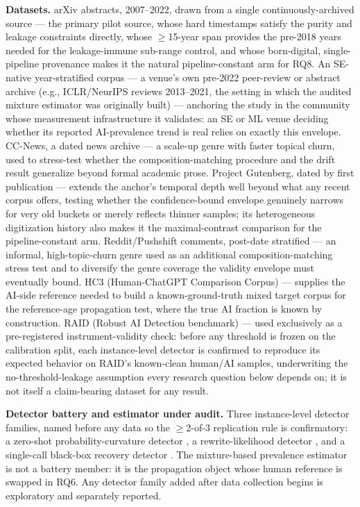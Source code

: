 \documentclass[conference]{IEEEtran}
\begin{document}
\textbf{Datasets.}  arXiv abstracts, 2007--2022, drawn from a single continuously-archived source --- the primary pilot source, whose hard timestamps satisfy the purity and leakage constraints directly, whose $\geq$15-year span provides the pre-2018 years needed for the leakage-immune sub-range control, and whose born-digital, single-pipeline provenance makes it the natural pipeline-constant arm for RQ8. An SE-native year-stratified corpus --- a venue's own pre-2022 peer-review or abstract archive (e.g., ICLR/NeurIPS reviews 2013--2021, the setting in which the audited mixture estimator \cite{MonitorAIScale} was originally built) --- anchoring the study in the community whose measurement infrastructure it validates: an SE or ML venue deciding whether its reported AI-prevalence trend is real relies on exactly this envelope. CC-News, a dated news archive --- a scale-up genre with faster topical churn, used to stress-test whether the composition-matching procedure and the drift result generalize beyond formal academic prose. Project Gutenberg, dated by first publication --- extends the anchor's temporal depth well beyond what any recent corpus offers, testing whether the confidence-bound envelope genuinely narrows for very old buckets or merely reflects thinner samples; its heterogeneous digitization history also makes it the maximal-contrast comparison for the pipeline-constant arm. Reddit/Pushshift comments, post-date stratified --- an informal, high-topic-churn genre used as an additional composition-matching stress test and to diversify the genre coverage the validity envelope must eventually bound. HC3 (Human-ChatGPT Comparison Corpus) --- supplies the AI-side reference needed to build a known-ground-truth mixed target corpus for the reference-age propagation test, where the true AI fraction is known by construction. RAID (Robust AI Detection benchmark) \cite{RAID} --- used exclusively as a pre-registered instrument-validity check: before any threshold is frozen on the calibration split, each instance-level detector is confirmed to reproduce its expected behavior on RAID's known-clean human/AI samples, underwriting the no-threshold-leakage assumption every research question below depends on; it is not itself a claim-bearing dataset for any result.

\smallskip\noindent\textbf{Detector battery and estimator under audit.} Three instance-level detector families, named before any data so the $\geq$2-of-3 replication rule is confirmatory: a zero-shot probability-curvature detector \cite{DetectGPT}, a rewrite-likelihood detector \cite{LearnToDistance}, and a single-call black-box recovery detector \cite{DnR}. The mixture-based prevalence estimator \cite{MonitorAIScale} is not a battery member: it is the propagation object whose human reference is swapped in RQ6. Any detector family added after data collection begins is exploratory and separately reported.
\end{document}
